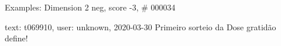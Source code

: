 \begin{frame}{Examples: Dimension 2 neg, score -3, \# 000034}
\footnotesize
\begin{alertblock}{text: t069910, user: unknown, 2020-03-30}
Primeiro sorteio da Dose  
 gratidão define! 
\end{alertblock}
\end{frame}
